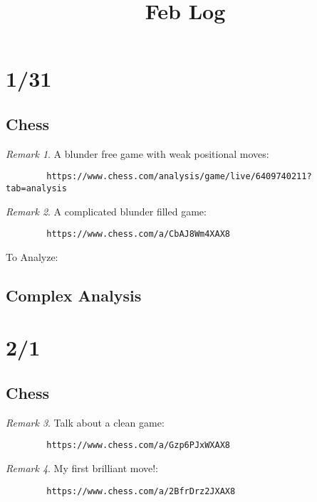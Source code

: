 \documentclass[11pt]{article}
\title{Feb Log}
\theoremstyle{remark}
\newtheorem{remark}{Remark}
\begin{document}
\maketitle

\section{1/31}

\subsection{Chess}

\begin{remark}
	A blunder free game with weak positional moves:
	\begin{verbatim}
		https://www.chess.com/analysis/game/live/6409740211?tab=analysis
	\end{verbatim}
\end{remark}

\begin{remark}
	A complicated blunder filled game:
	\begin{verbatim}
		https://www.chess.com/a/CbAJ8Wm4XAX8
	\end{verbatim}	

	To Analyze:
\end{remark}

\subsection{Complex Analysis}

\section{2/1}

\subsection{Chess}

\begin{remark}
	Talk about a clean game:
	\begin{verbatim}
		https://www.chess.com/a/Gzp6PJxWXAX8
	\end{verbatim}
\end{remark}

\begin{remark}
	My first brilliant move!:
	\begin{verbatim}
		https://www.chess.com/a/2BfrDrz2JXAX8
	\end{verbatim}
\end{remark}
\end{document}
